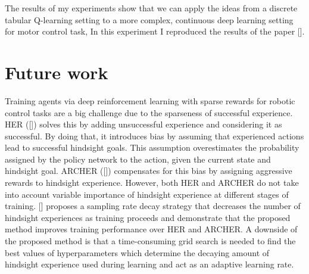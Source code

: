 \documentclass[conference]{IEEEtran}
\begin{document}
The results of my experiments show that we can apply the ideas from a discrete tabular Q-learning setting to a more complex, continuous deep learning setting for motor control task, In this experiment I reproduced the results of the paper [\cite{plappert2018multi}]. 

\section{Future work} \label{sec:future_work}
Training agents via deep reinforcement learning with sparse rewards for robotic control tasks are a big challenge due to the sparseness of successful experience. HER ([\cite{andrychowicz2017hindsight}]) solves this by adding unsuccessful experience and considering it as successful. By doing that, it introduces bias by assuming that experienced actions lead to successful hindsight goals. This assumption overestimates the probability assigned by the policy network to the action, given the current state and hindsight goal. ARCHER ([\cite{lanka2018archer}]) compensates for this bias by assigning aggressive rewards to hindsight experience. However, both HER and ARCHER do not take into account variable importance of hindsight experience at different stages of training. [\cite{vecchietti2020sampling}] proposes a sampling rate decay strategy that decreases the number of hindsight experiences as training proceeds and demonstrate that the proposed method improves training performance over HER and ARCHER. A downside of the proposed method is that a time-consuming grid search is needed to find the best values of hyperparameters which determine the decaying amount of hindsight experience used during learning and act as an adaptive learning rate.
\end{document}
